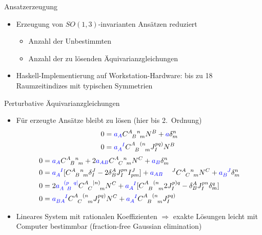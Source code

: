 \documentclass{beamer}
\newcommand{\gmc}[4]{\ensuremath{C^{#1\hphantom{#2}#3}_{\hphantom{#1}{#2}\hphantom{#3}#4}}}
\begin{document}
    \begin{frame}{Ansatzerzeugung}
        \begin{itemize}
            \item Erzeugung von $SO(1,3)$-invarianten Ansätzen reduziert
            \begin{itemize}
                \item Anzahl der Unbestimmten
                \item Anzahl der zu lösenden Äquivarianzgleichungen
            \end{itemize}
            \item Haskell-Implementierung auf Workstation-Hardware: bis zu 18 Raumzeitindizes mit typischen Symmetrien
        \end{itemize}
    \end{frame}

    \begin{frame}{Perturbative Äquivarianzgleichungen}
        \begin{itemize}
            \item Für erzeugte Ansätze bleibt zu lösen (hier bis 2.\ Ordnung)
            \begin{align*}
                0 &{} = {\color{blue}a_A} \gmc{A}{B}{n}{m} N^B + {\color{blue}a} \delta^n_m \\
                0 &{} = {\color{blue}a_A^{\hphantom AI}}\gmc{A}{B}{(n}{m} J^{pq)}_I N^B
            \end{align*}
            \begin{align*}
                0 &{} = {\color{blue}a_A} \gmc{A}{B}{n}{m} + 2 {\color{blue}a_{AB}} \gmc{A}{C}{n}{m} N^C + {\color{blue}a_B} \delta^n_m \\
                0 &{} = {\color{blue}a_A^{\hphantom AI}}\lbrack \gmc{A}{B}{n}{m} \delta^J_I - 2\delta^A_B J^{pn}_I I^J_{pm}\rbrack + {\color{blue}a_{AB}}^{\hphantom{AB}J}\gmc{A}{C}{n}{m} N^C + {\color{blue}a_B^{\hphantom BJ}} \delta^n_m \\
                0 &{} = 2{\color{blue}a_{A \hphantom pB}^{\hphantom A(p\hphantom Bq\mid}} \gmc{A}{C}{\mid n)}{m} N^C + {\color{blue}a_A^{\hphantom AI}}\lbrack \gmc{A}{B}{(n}{m} 2J^{p)q}_I - \delta^A_B J^{pn}_I \delta^q_m\rbrack \\
                0 &{} = {\color{blue}a_{BA}^{\hphantom{BA}I}} \gmc{A}{C}{(n}{m} J^{pq)}_I N^C + {\color{blue}a_A^{\hphantom AI}}\gmc{A}{B}{(n}{m} J^{pq)}_I
            \end{align*}
            \item Lineares System mit rationalen Koeffizienten $\Rightarrow$ exakte Lösungen leicht mit
            Computer bestimmbar (fraction-free Gaussian elimination)
        \end{itemize}
    \end{frame}
\end{document}
